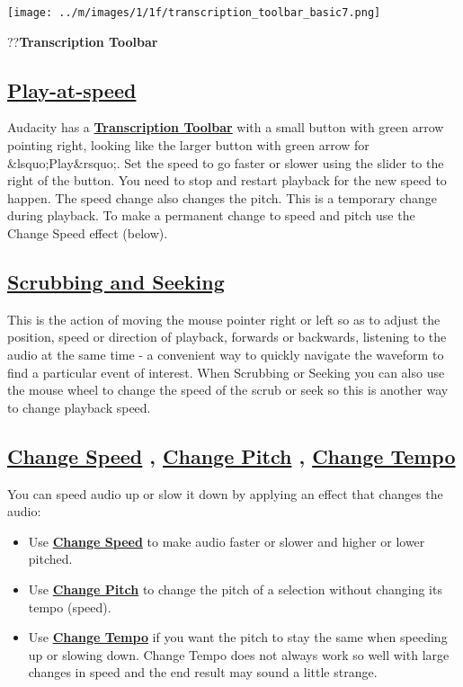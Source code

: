 \documentclass[]{book}
\begin{document}
\begin{multicols}{2}
\par\texttt{[image: ../m/images/1/1f/transcription\_toolbar\_basic7.png]}\par??\textbf{Transcription Toolbar}

\subsection{
\hyperref[transcription_toolbar_]{Play-at-speed}
}


Audacity has a \textbf{
\hyperref[transcription_toolbar_]{Transcription Toolbar}
} with a small button with green arrow pointing right, looking like the larger button with green arrow for \&lsquo;Play\&rsquo;.  Set the speed to go faster or slower using the slider to the right of the button.  You need to stop and restart playback for the new speed to happen. The speed change also changes the pitch.  This is a temporary change during playback.  To make a permanent change to speed and pitch use the Change Speed effect (below).

\subsection{
\hyperref[scrubbing_and_seeking_]{Scrubbing and Seeking}
}


This is the action of moving the mouse pointer right or left so as to adjust the position, speed or direction of playback, forwards or backwards, listening to the audio at the same time - a convenient way to quickly navigate the waveform to find a particular event of interest. When Scrubbing or Seeking you can also use the mouse wheel to change the speed of the scrub or seek so this is another way to change playback speed.

\subsection{
\hyperref[change_speed_]{Change Speed}
, 
\hyperref[change_pitch_]{Change Pitch}
, 
\hyperref[change_tempo_]{Change Tempo}
}


You can speed audio up or slow it down by applying an effect that changes the audio:  
\begin{itemize}
\item  Use \textbf{
\hyperref[change_speed_]{Change Speed}
} to make audio faster or slower and higher or lower pitched. 
\item  Use \textbf{
\hyperref[change_pitch_]{Change Pitch}
} to change the pitch of a selection without changing its tempo (speed). 
\item  Use \textbf{
\hyperref[change_tempo_]{Change Tempo}
} if you want the pitch to stay the same when speeding up or slowing down. Change Tempo does not always work so well with large changes in speed and the end result may sound a little strange.
\end{itemize}


\end{multicols}
\end{document}
